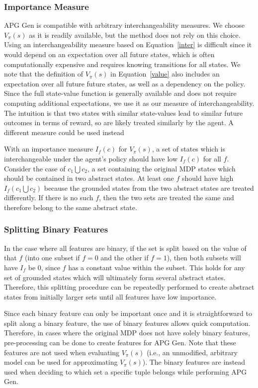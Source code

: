 \documentclass[letterpaper]{article} %
\begin{document}
\subsubsection{Importance Measure}
APG Gen is compatible with arbitrary interchangeability measures. We choose $V_{\pi}(s)$ as it is readily available, but the method does not rely on this choice. Using an interchangeability measure based on Equation~\ref{inter} is difficult since it would depend on an expectation over all future states, which is often computationally expensive and requires knowing transitions for all states. We note that the definition of $V_{\pi}(s)$ in Equation~\ref{value} also includes an expectation over all future future states, as well as a dependency on the policy. Since the full state-value function is generally available and does not require computing additional expectations, we use it as our measure of interchangeability. The intuition is that two states with similar state-values lead to similar future outcomes in terms of reward, so are likely treated similarly by the agent. A different measure could be used instead

With an importance measure $I_f(c)$ for $V_{\pi}(s)$, a set of states which is interchangeable under the agent's policy should have low $I_f(c)$ for all $f$. Consider the case of $c_1 \bigcup c_2$, a set containing the original MDP states which should be contained in two abstract states.
At least one $f$ should have high $I_f(c_1 \bigcup c_2)$ because the grounded states from the two abstract states are treated differently.
If there is no such $f$, then the two sets are treated the same and therefore belong to the same abstract state.

\subsubsection{Splitting Binary Features}
In the case where all features are binary, if the set is split based on the value of that $f$ (into one subset if $f=0$ and the other if $f=1$), then both subsets will have $I_f$ be 0, since $f$ has a constant value within the subset. This holds for any set of grounded states which will ultimately form several abstract states. Therefore, this splitting procedure can be repeatedly performed to create abstract states from initially larger sets until all features have low importance.

Since each binary feature can only be important once and it is straightforward to split along a binary feature, the use of binary features allows quick computation. Therefore, in cases where the original MDP does not have solely binary features, pre-processing can be done to create features for APG Gen. Note that these features are not used when evaluating $V_{\pi}(s)$ (i.e., an unmodified, arbitrary model can be used for approximating $V_{\pi}(s)$). The binary features are instead used when deciding to which set a specific tuple belongs while performing APG Gen.
\end{document}
